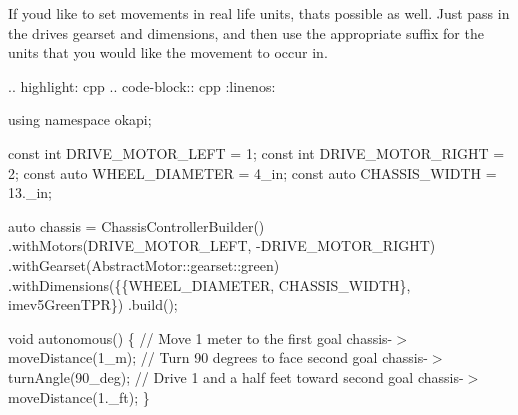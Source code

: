 If you\textquotesingle{}d like to set movements in real life units, that\textquotesingle{}s possible as well. Just pass in the drive\textquotesingle{}s gearset and dimensions, and then use the appropriate suffix for the units that you would like the movement to occur in.

.. highlight\+: cpp .. code-\/block\+:: cpp \+:linenos\+:

using namespace okapi;

const int D\+R\+I\+V\+E\+\_\+\+M\+O\+T\+O\+R\+\_\+\+L\+E\+FT = 1; const int D\+R\+I\+V\+E\+\_\+\+M\+O\+T\+O\+R\+\_\+\+R\+I\+G\+HT = 2; const auto W\+H\+E\+E\+L\+\_\+\+D\+I\+A\+M\+E\+T\+ER = 4\+\_\+in; const auto C\+H\+A\+S\+S\+I\+S\+\_\+\+W\+I\+D\+TH = 13.\+\_\+in;

auto chassis = Chassis\+Controller\+Builder() .with\+Motors(D\+R\+I\+V\+E\+\_\+\+M\+O\+T\+O\+R\+\_\+\+L\+E\+FT, -\/D\+R\+I\+V\+E\+\_\+\+M\+O\+T\+O\+R\+\_\+\+R\+I\+G\+HT) .with\+Gearset(\+Abstract\+Motor\+::gearset\+::green) .with\+Dimensions(\{\{W\+H\+E\+E\+L\+\_\+\+D\+I\+A\+M\+E\+T\+ER, C\+H\+A\+S\+S\+I\+S\+\_\+\+W\+I\+D\+TH\}, imev5\+Green\+T\+PR\}) .build();

void autonomous() \{ // Move 1 meter to the first goal chassis-\/$>$move\+Distance(1\+\_\+m); // Turn 90 degrees to face second goal chassis-\/$>$turn\+Angle(90\+\_\+deg); // Drive 1 and a half feet toward second goal chassis-\/$>$move\+Distance(1.\+\_\+ft); \} 